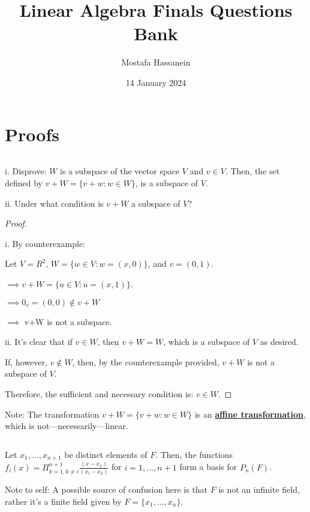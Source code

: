 \documentclass{article}
\author{Mostafa Hassanein}
\title{Linear Algebra Finals Questions Bank}
\date{14 January 2024}
\newenvironment{customthm}[1]
  {\renewcommand\theinnercustomthm{#1}\innercustomthm}
  {\endinnercustomthm}
\begin{document}
\maketitle

\newpage

\section*{Proofs}

\begin{customthm}{1}[2023.S(1.A.i)]
  $ $

  i. Disprove: $W$ is a subspace of the vector space $V$ and $v \in V$. Then, the set defined by $v+W = \{ v+w: w \in W \}$, is a subspace of $V$.
  \newline

  ii. Under what condition is $v+W$ a subspace of $V$?
\end{customthm}

\begin{proof}
  $ $

  i. By counterexample: 
  
  Let $V = R^2$, $W = \{ w \in V: w = (x,0) \}$, and $v = (0, 1)$.
  
  \noindent
  $\implies v+W = \{ u \in V: u = (x, 1) \}$.

  \noindent
  $\implies 0_v = (0, 0) \notin v+W$

  \noindent
  $\implies$ v+W is not a subspace.
  \newline

  ii. It's clear that if $v \in W$, then $v+W = W$, which is a subspace of $V$ as desired.

  If, however, $v \notin W$, then, by the counterexample provided, $v+W$ is not a subspace of $V$.

  Therefore, the sufficient and necessary condition is: $v \in W$.

\end{proof}

\noindent
Note: The transformation $v+W = \{ v+w: w \in W \}$ is an \underline{\textbf{affine transformation}}, which is not—necessarily—linear.

\newpage

\begin{customthm}{2}[2023.S(1.A.ii)]
  $ $

  Let $x_1,\ldots,x_{n+1}$ be distinct elements of $F$. Then, the functions $f_i(x)= \Pi_{k=1,k \neq i}^{n+1} \frac{(x-x_k)}{(x_i-x_k)}$ for $i=1,\ldots,n+1$ form a basis for $P_n(F)$.
  \newline

  Note to self: A possible source of confusion here is that $F$ is not an infinite field, rather it's a finite field given by $F = \{x_1,\ldots,x_n \}$.
\end{customthm}
\end{document}
